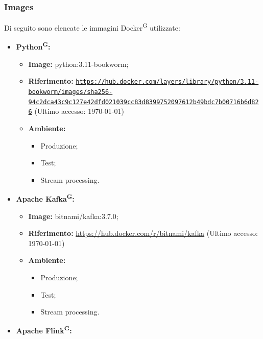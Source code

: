 \documentclass[8pt]{article}
\newcommand{\glossterm}[1]{#1\textsuperscript{G}} %
\begin{document}
\subsubsection{Images}
Di seguito sono elencate le immagini \glossterm{Docker} utilizzate:
\begin{itemize}
	\setlength\itemsep{0em}
    \item \textbf{\glossterm{Python}:}
    \begin{itemize}
	\setlength\itemsep{0em}
        \item \textbf{Image:} python:3.11-bookworm;
        \item \textbf{Riferimento:}  \href{https://hub.docker.com/layers/library/python/3.11-bookworm/images/sha256-94c2dca43c9c127e42dfd021039cc83d8399752097612b49bdc7b00716b6d826}{\color{myblue}\nolinkurl{https://hub.docker.com/layers/library/python/3.11-bookworm/images/sha256-94c2dca43c9c127e42dfd021039cc83d8399752097612b49bdc7b00716b6d826}} (Ultimo accesso: \today)
        \item \textbf{Ambiente:}
        \begin{itemize}
	\setlength\itemsep{0em}
            \item Produzione;
            \item Test;
            \item Stream processing.
        \end{itemize}
    \end{itemize}
    \clearpage
    \item \textbf{Apache \glossterm{Kafka}:}
    \begin{itemize}
	\setlength\itemsep{0em}
        \item \textbf{Image:} bitnami/kafka:3.7.0;
        \item \textbf{Riferimento:}  \href{https://hub.docker.com/r/bitnami/kafka}{\color{myblue}https://hub.docker.com/r/bitnami/kafka} (Ultimo accesso: \today)
        \item \textbf{Ambiente:}
        \begin{itemize}
	\setlength\itemsep{0em}
            \item Produzione;
            \item Test;
            \item Stream processing.
        \end{itemize}
    \end{itemize}
    \item \textbf{Apache \glossterm{Flink}:}
    \begin{itemize}

\end{itemize}
\end{itemize}
\end{document}

